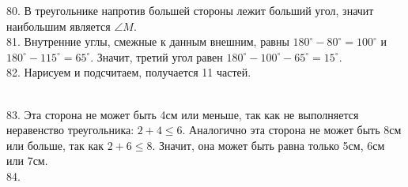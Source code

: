\documentclass[12pt]{article}
\begin{document}
80. В треугольнике напротив большей стороны лежит больший угол, значит наибольшим является $\angle M.$\\
81. Внутренние углы, смежные к данным внешним, равны $180^\circ-80^\circ=100^\circ$ и $180^\circ-115^\circ=65^\circ.$ Значит, третий угол равен $180^\circ-100^\circ-65^\circ=15^\circ.$\\
82. Нарисуем и подсчитаем, получается 11 частей.
\begin{figure}[ht!]
\end{figure}\\
83. Эта сторона не может быть 4см или меньше, так как не выполняется неравенство треугольника: $2+4\leqslant6.$ Аналогично эта сторона не может быть 8см или больше, так как $2+6\leqslant8.$ Значит, она может быть равна только 5см, 6см или 7см.\\
84. \begin{figure}[ht!]
\end{figure}\\
\end{document}
